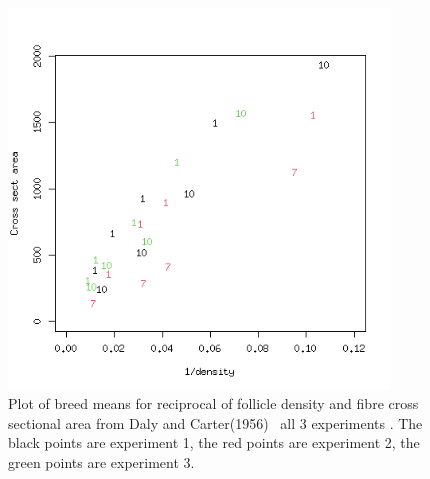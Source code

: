 %

\begin{figure}[h]
  \centering
   \includegraphics[width=0.9\textwidth]{DC1955/dc123.png}
  \caption{Plot of breed means for reciprocal of follicle density and fibre cross sectional area from Daly and Carter(1956)~\cite{daly:56}  all 3 experiments .  The black points are experiment 1, the red points are experiment 2, the green points are experiment 3.}
  \label{fig:dc123}
\end{figure}

%

